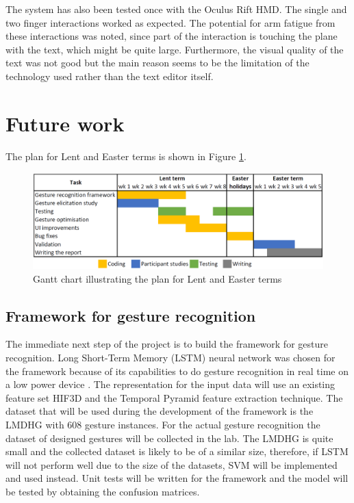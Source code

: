 \documentclass[a4paper, 12pt]{article}
\begin{document}
The system has also been tested once with the Oculus Rift HMD. The single and two finger interactions worked as expected. The potential for arm fatigue from these interactions was noted, since part of the interaction is touching the plane with the text, which might be quite large. Furthermore, the visual quality of the text was not good but the main reason seems to be the limitation of the technology used rather than the text editor itself.

\section{Future work}

The plan for Lent and Easter terms is shown in Figure \ref{gantt}.
\begin{figure}
	\centering
	\includegraphics[scale=0.75]{gantt_chart}
	\caption{Gantt chart illustrating the plan for Lent and Easter terms}
	\label{gantt}
\end{figure}

\vspace{-0.3cm}
\subsection{Framework for gesture recognition}
The immediate next step of the project is to build the framework for gesture recognition. Long Short-Term Memory (LSTM) neural network was chosen for the framework because of its capabilities to do gesture recognition in real time on a low power device \cite{lstm_real_time}. The representation for the input data will use an existing feature set HIF3D \cite{features} and the Temporal Pyramid feature extraction technique. The dataset that will be used during the development of the framework is the LMDHG \cite{gesture_dataset} with 608 gesture instances. For the actual gesture recognition the dataset of designed gestures will be collected in the lab. The LMDHG is quite small and the collected dataset is likely to be of a similar size, therefore, if LSTM will not perform well due to the size of the datasets, SVM will be implemented and used instead. Unit tests will be written for the framework and the model will be tested by obtaining the confusion matrices.
\end{document}
